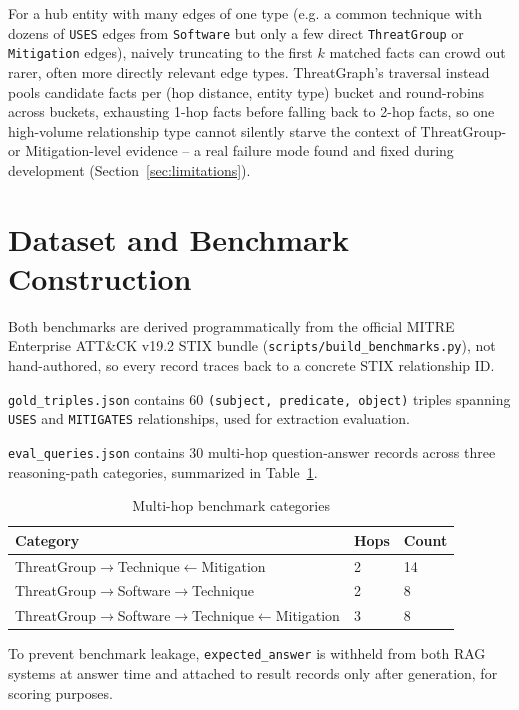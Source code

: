 \documentclass[conference]{IEEEtran}
\begin{document}
For a hub entity with many edges of one type (e.g. a common technique with
dozens of \texttt{USES} edges from \texttt{Software} but only a few direct
\texttt{ThreatGroup} or \texttt{Mitigation} edges), naively truncating to the
first $k$ matched facts can crowd out rarer, often more directly relevant
edge types. ThreatGraph's traversal instead pools candidate facts per (hop
distance, entity type) bucket and round-robins across buckets, exhausting
1-hop facts before falling back to 2-hop facts, so one high-volume
relationship type cannot silently starve the context of ThreatGroup- or
Mitigation-level evidence -- a real failure mode found and fixed during
development (Section~\ref{sec:limitations}).

\section{Dataset and Benchmark Construction}
\label{sec:dataset}
Both benchmarks are derived programmatically from the official MITRE
Enterprise ATT\&CK v19.2 STIX bundle (\texttt{scripts/build\_benchmarks.py}),
not hand-authored, so every record traces back to a concrete STIX
relationship ID.

\texttt{gold\_triples.json} contains 60 \texttt{(subject, predicate,
object)} triples spanning \texttt{USES} and \texttt{MITIGATES}
relationships, used for extraction evaluation.

\texttt{eval\_queries.json} contains 30 multi-hop question-answer records
across three reasoning-path categories, summarized in
Table~\ref{tab:benchmark-categories}.

\begin{table}[h]
\centering
\caption{Multi-hop benchmark categories}
\label{tab:benchmark-categories}
\begin{tabular}{@{}lll@{}}
\toprule
Category & Hops & Count \\
\midrule
ThreatGroup$\to$Technique$\leftarrow$Mitigation & 2 & 14 \\
ThreatGroup$\to$Software$\to$Technique & 2 & 8 \\
ThreatGroup$\to$Software$\to$Technique$\leftarrow$Mitigation & 3 & 8 \\
\bottomrule
\end{tabular}
\end{table}

To prevent benchmark leakage, \texttt{expected\_answer} is withheld from
both RAG systems at answer time and attached to result records only after
generation, for scoring purposes.
\end{document}

